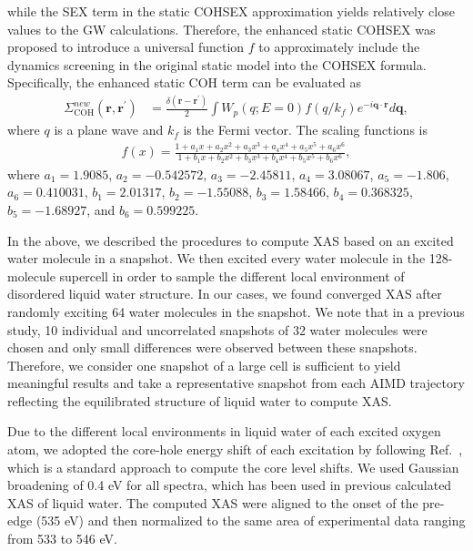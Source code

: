 \documentclass[prb,twocolumn,showpacs,preprintnumbers,superscriptaddress,amsmath,amssymb]{revtex4}
\begin{document}
while the SEX term in the static COHSEX approximation yields relatively close values to the GW calculations.\cite{kang2010enhanced}
Therefore, the enhanced static COHSEX was proposed to introduce a universal function $f$ to approximately
include the dynamics screening in the original static model
into the COHSEX formula.
Specifically, the enhanced static COH term can be evaluated as
\begin{align}
\Sigma_{\mathrm{COH}}^{new}(\mathbf{r},\mathbf{r^{\prime}})&=\frac{\delta(\mathbf{r-r^{\prime}})}{2}
\int W_{p}(q;E=0)f(q/k_{f})e^{-i\mathbf{q}\cdot\mathbf{r}}d\mathbf{q},
\end{align}
where $q$ is a plane wave and $k_f$ is the Fermi vector.
The scaling functions is
\begin{align}
f(x)=\frac{1+a_1x+a_2x^2+a_3x^3+a_4x^4+a_5x^5+a_6x^6}{1+b_1x+b_2x^2+b_3x^3+b_4x^4+b_5x^5+b_6x^6},
\end{align}
where $a_1=1.9085$, $a_2=-0.542572$, $a_3=-2.45811$, $a_4=3.08067$, $a_5=-1.806$, $a_6=0.410031$,
$b_1=2.01317$, $b_2=-1.55088$, $b_3=1.58466$, $b_4=0.368325$, $b_5=-1.68927$, and $b_6=0.599225$.


In the above, we described the procedures to compute XAS based on an excited water molecule in a snapshot.
We then excited every water molecule in the 128-molecule supercell in order to sample 
the different local environment of disordered liquid water structure.
In our cases, we found converged XAS after randomly exciting 64 water molecules in the snapshot.  
We note that in a previous study, 10 individual and uncorrelated snapshots of 32 water molecules were chosen
and only small differences were observed between these snapshots.\cite{giulia2006PRLxas}
Therefore, we consider one snapshot of a large cell is sufficient to yield meaningful results and
take a representative snapshot from each AIMD trajectory 
reflecting the equilibrated structure of liquid water to compute XAS.


Due to the different local environments in liquid water of each excited oxygen atom,
we adopted the core-hole energy shift of each excitation by following
Ref.~,
which is a standard approach to compute the core level shifts. 
We used Gaussian broadening of 0.4 eV for all spectra,
which has been used in previous calculated XAS of liquid water.\cite{chen2010PRLxas,kong2012PRB}
The computed XAS were aligned to the onset of the pre-edge (535 eV) and then
normalized to the same area of experimental data ranging from 533 to 546 eV.
\end{document}
